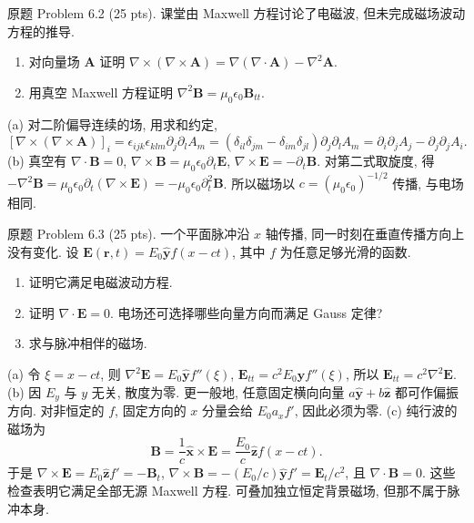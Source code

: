 \begin{exercise}\label{ps:6.2}
原题 Problem 6.2 (25 pts). 课堂由 Maxwell 方程讨论了电磁波, 但未完成磁场波动方程的推导.
\begin{enumerate}[label=\alph*.]
\item 对向量场 $\mathbf A$ 证明 $\nabla\times(\nabla\times\mathbf A)=\nabla(\nabla\cdot\mathbf A)-\nabla^2\mathbf A$.
\item 用真空 Maxwell 方程证明 $\nabla^2\mathbf B=\mu_0\epsilon_0\mathbf B_{tt}$.
\end{enumerate}
\end{exercise}
\begin{solution}
(a) 对二阶偏导连续的场, 用求和约定,
\[
 [\nabla\times(\nabla\times\mathbf A)]_i
 =\epsilon_{ijk}\epsilon_{klm}\partial_j\partial_l A_m
 =(\delta_{il}\delta_{jm}-\delta_{im}\delta_{jl})\partial_j\partial_l A_m
 =\partial_i\partial_j A_j-\partial_j\partial_j A_i.
\]
(b) 真空有 $\nabla\cdot\mathbf B=0$, $\nabla\times\mathbf B=\mu_0\epsilon_0\partial_t\mathbf E$, $\nabla\times\mathbf E=-\partial_t\mathbf B$. 对第二式取旋度, 得
$-\nabla^2\mathbf B=\mu_0\epsilon_0\partial_t(\nabla\times\mathbf E)=-\mu_0\epsilon_0\partial_t^2\mathbf B$.
所以磁场以 $c=(\mu_0\epsilon_0)^{-1/2}$ 传播, 与电场相同.
\end{solution}

\begin{exercise}\label{ps:6.3}
原题 Problem 6.3 (25 pts). 一个平面脉冲沿 $x$ 轴传播, 同一时刻在垂直传播方向上没有变化. 设
$\mathbf E(\mathbf r,t)=E_0\hat{\mathbf y}f(x-ct)$, 其中 $f$ 为任意足够光滑的函数.
\begin{enumerate}[label=\alph*.]
\item 证明它满足电磁波动方程.
\item 证明 $\nabla\cdot\mathbf E=0$. 电场还可选择哪些向量方向而满足 Gauss 定律?
\item 求与脉冲相伴的磁场.
\end{enumerate}
\end{exercise}
\begin{solution}
(a) 令 $\xi=x-ct$, 则 $\nabla^2\mathbf E=E_0\hat{\mathbf y}f''(\xi)$, $\mathbf E_{tt}=c^2E_0\hat{\mathbf y}f''(\xi)$, 所以 $\mathbf E_{tt}=c^2\nabla^2\mathbf E$.
(b) 因 $E_y$ 与 $y$ 无关, 散度为零. 更一般地, 任意固定横向向量 $a\hat{\mathbf y}+b\hat{\mathbf z}$ 都可作偏振方向. 对非恒定的 $f$, 固定方向的 $x$ 分量会给 $E_0a_x f'$, 因此必须为零.
(c) 纯行波的磁场为
\[
\mathbf B=\frac1c\hat{\mathbf x}\times\mathbf E
 =\frac{E_0}{c}\hat{\mathbf z}f(x-ct).
\]
于是 $\nabla\times\mathbf E=E_0\hat{\mathbf z}f'=-\mathbf B_t$, $\nabla\times\mathbf B=-(E_0/c)\hat{\mathbf y}f'=\mathbf E_t/c^2$, 且 $\nabla\cdot\mathbf B=0$. 这些检查表明它满足全部无源 Maxwell 方程. 可叠加独立恒定背景磁场, 但那不属于脉冲本身.
\end{solution}


